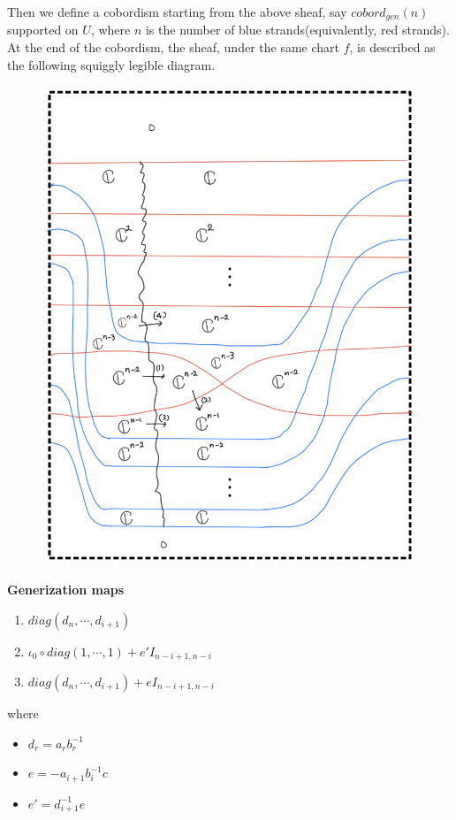 Then we define a cobordism starting from the above sheaf, say $cobord_{gen}(n)$ supported on $U$, where $n$ is the number of blue strands(equivalently, red strands). At the end of the cobordism, the sheaf, under the same chart $f$, is described as the following squiggly legible diagram. 
\begin{figure}[H]
    \centering
    \includegraphics[scale = 0.95]{diagrams/cobord_gen/15.png}
    \caption{}
    \label{fig:your-label}
\end{figure}
\textbf{Generization maps}
\begin{enumerate}[label = (\arabic*)]
\item $diag(d_n,\cdots,d_{i+1})$

\item $\iota_0 \circ diag(1,\cdots,1) + e' I_{n-i+1,n-i}$

\item $diag(d_n,\cdots,d_{i+1}) + e I_{n-i+1,n-i}$
\end{enumerate}
where
\begin{itemize}
\item $d_r = a_r b_r^{-1}$
\item $e = -a_{i+1}b_i^{-1}c$
\item $e' = d_{i+1}^{-1}e$
\end{itemize}
